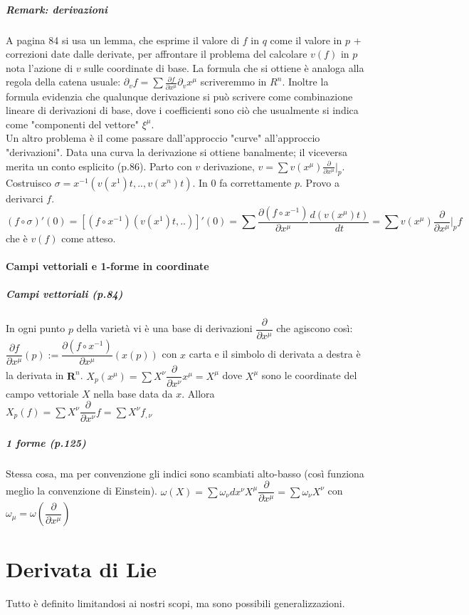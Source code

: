 \documentclass[]{article}
\begin{document}
\subparagraph{Remark: derivazioni}
A pagina 84 si usa un lemma, che esprime il valore di $f$ in $q$ come il valore in $p$ + correzioni date dalle derivate, per affrontare il problema del calcolare $v(f)$ in $p$ nota l'azione di $v$ sulle coordinate di base. La formula che si ottiene è analoga alla regola della catena usuale: $\partial_v f = \sum \frac{\partial f}{\partial x^\mu} \partial_v x^\mu$ scriveremmo in $R^n$. Inoltre la formula evidenzia che qualunque derivazione si può scrivere come combinazione lineare di derivazioni di base, dove i coefficienti sono ciò che usualmente si indica come "componenti del vettore" $\xi^\mu$.\\
Un altro problema è il come passare dall'approccio "curve" all'approccio "derivazioni". Data una curva la derivazione si ottiene banalmente; il viceversa merita un conto esplicito (p.86). Parto con $v$ derivazione, $v = \sum v(x^\mu) \frac{\partial}{\partial x^\mu}|_p$. Costruisco $\sigma = x^{-1} (v(x^1) t, .., v(x^n)t)$. In $0$ fa correttamente $p$. Provo a derivarci $f$.
$$(f \circ \sigma)'(0) = [(f \circ x^{-1}) (v(x^1) t, ..)]'(0) = \sum \frac{\partial (f \circ x^{-1})}{\partial x^\mu} \frac{d (v(x^\mu) t)}{dt} = \sum v(x^\mu) \frac{\partial}{\partial x^\mu}|_p f$$
che è $v(f)$ come atteso.

\paragraph{Campi vettoriali e 1-forme in coordinate}
\subparagraph{Campi vettoriali (p.84)}
In ogni punto $p$ della varietà vi è una base di derivazioni $\dfrac{\partial}{\partial x^\mu}$ che agiscono così: $\dfrac{\partial f}{\partial x^\mu} (p) := \dfrac{\partial (f \circ x^{-1})}{\partial x^\mu} (x(p))$ con $x$ carta e il simbolo di derivata a destra è la derivata in $\mathbf{R}^n$. $X_p (x^\mu) = \sum X^\nu \dfrac{\partial}{\partial x^\nu}x^\mu = X^\mu$ dove $X^\mu$ sono le coordinate del campo vettoriale $X$ nella base data da $x$. Allora $X_p(f) = \sum X^\nu \dfrac{\partial}{\partial x^\nu}f = \sum X^\nu f_{,\nu}$
\subparagraph{1 forme (p.125)}
Stessa cosa, ma per convenzione gli indici sono scambiati alto-basso (così funziona meglio la convenzione di Einstein). $\omega(X) = \sum \omega_\nu dx^\nu X^\mu \dfrac{\partial}{\partial x^\mu} = \sum \omega_\nu X^\nu$ con $\omega_\mu = \omega (\dfrac{\partial}{\partial x^\mu})$

\section{Derivata di Lie}
Tutto è definito limitandosi ai nostri scopi, ma sono possibili generalizzazioni.
\end{document}
